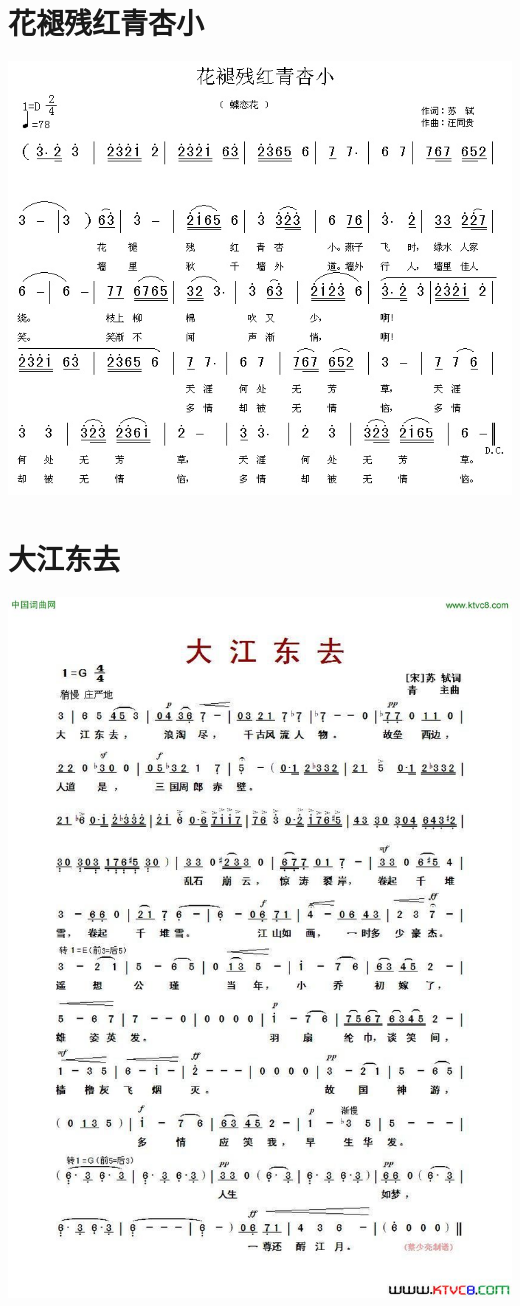 \documentclass[cn,pad,twocol]{elegantbook}
\begin{document}
\section{花褪残红青杏小}            \includegraphics[width=\textwidth]{dongxiao/20200801-苏轼-花褪残红青杏小} 
\section{大江东去}                  \includegraphics[width=\textwidth]{rpi400/20201230大江东去.jpg}
\end{document}
